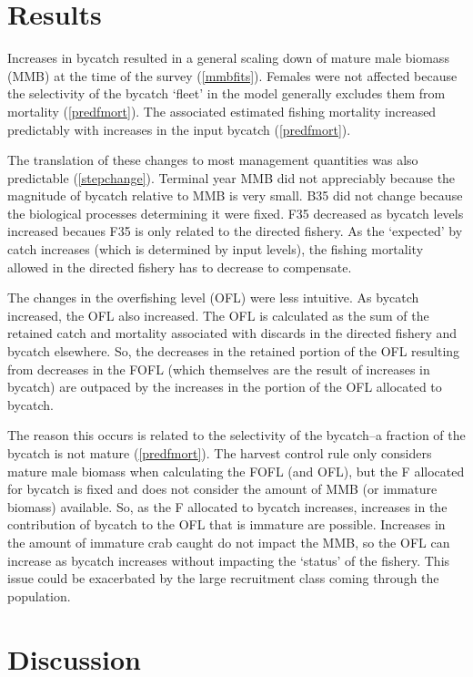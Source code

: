 \documentclass[]{article}
\begin{document}
\section{Results}\label{results}

Increases in bycatch resulted in a general scaling down of mature male
biomass (MMB) at the time of the survey (\autoref{mmbfits}). Females
were not affected because the selectivity of the bycatch `fleet' in the
model generally excludes them from mortality (\autoref{predfmort}). The
associated estimated fishing mortality increased predictably with
increases in the input bycatch (\autoref{predfmort}).

The translation of these changes to most management quantities was also
predictable (\autoref{stepchange}). Terminal year MMB did not
appreciably because the magnitude of bycatch relative to MMB is very
small. B35 did not change because the biological processes determining
it were fixed. F35 decreased as bycatch levels increased becaues F35 is
only related to the directed fishery. As the `expected' by catch
increases (which is determined by input levels), the fishing mortality
allowed in the directed fishery has to decrease to compensate.

The changes in the overfishing level (OFL) were less intuitive. As
bycatch increased, the OFL also increased. The OFL is calculated as the
sum of the retained catch and mortality associated with discards in the
directed fishery and bycatch elsewhere. So, the decreases in the
retained portion of the OFL resulting from decreases in the FOFL (which
themselves are the result of increases in bycatch) are outpaced by the
increases in the portion of the OFL allocated to bycatch.

The reason this occurs is related to the selectivity of the bycatch--a
fraction of the bycatch is not mature (\autoref{predfmort}). The harvest
control rule only considers mature male biomass when calculating the
FOFL (and OFL), but the F allocated for bycatch is fixed and does not
consider the amount of MMB (or immature biomass) available. So, as the F
allocated to bycatch increases, increases in the contribution of bycatch
to the OFL that is immature are possible. Increases in the amount of
immature crab caught do not impact the MMB, so the OFL can increase as
bycatch increases without impacting the `status' of the fishery. This
issue could be exacerbated by the large recruitment class coming through
the population.

\section{Discussion}\label{discussion}
\end{document}
